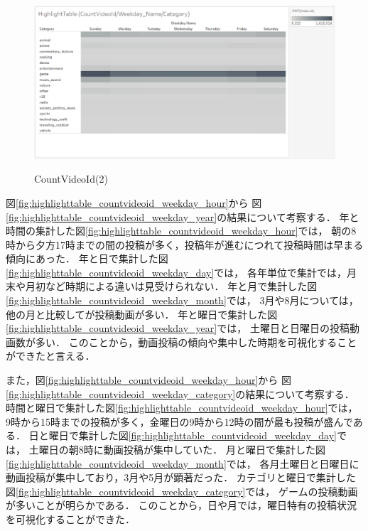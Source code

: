 \documentclass[submit,techrep,noauthor]{ipsj}
\begin{document}
\begin{figure}[h]
\begin{minipage}[b]{0.49\columnwidth}
    \label{fig:highlighttable_countvideoid_weekday_month}
  \end{minipage}
  \begin{minipage}[b]{0.49\columnwidth}
    \centering
    \includegraphics[width=\columnwidth]{./eps/HighlightTable_CountVideoId_WeekdayNameCategory.eps}
    \label{fig:highlighttable_countvideoid_weekday_category}
  \end{minipage}
  \caption{CountVideoId(2)}
  \label{fig:highlighttable_countvideoid_weekday}
\end{figure}
\vspace{-2.0zh}

図\ref{fig:highlighttable_countvideoid_weekday_hour}から
図\ref{fig:highlighttable_countvideoid_weekday_year}の結果について考察する．
%
年と時間の集計した図\ref{fig:highlighttable_countvideoid_weekday_hour}では，
朝の8時から夕方17時までの間の投稿が多く，投稿年が進むにつれて投稿時間は早まる傾向にあった．
%
年と日で集計した図\ref{fig:highlighttable_countvideoid_weekday_day}では，
各年単位で集計では，月末や月初など時期による違いは見受けられない．
%
年と月で集計した図\ref{fig:highlighttable_countvideoid_weekday_month}では，
3月や8月については，他の月と比較してが投稿動画が多い．
%
年と曜日で集計した図\ref{fig:highlighttable_countvideoid_weekday_year}では，
土曜日と日曜日の投稿動画数が多い．
%
このことから，動画投稿の傾向や集中した時期を可視化することができたと言える．

また，図\ref{fig:highlighttable_countvideoid_weekday_hour}から
図\ref{fig:highlighttable_countvideoid_weekday_category}の結果について考察する．
%
時間と曜日で集計した図\ref{fig:highlighttable_countvideoid_weekday_hour}では，
9時から15時までの投稿が多く，金曜日の9時から12時の間が最も投稿が盛んである．
%
日と曜日で集計した図\ref{fig:highlighttable_countvideoid_weekday_day}では，
土曜日の朝8時に動画投稿が集中していた．
%
月と曜日で集計した図\ref{fig:highlighttable_countvideoid_weekday_month}では，
各月土曜日と日曜日に動画投稿が集中しており，3月や5月が顕著だった．
%
カテゴリと曜日で集計した図\ref{fig:highlighttable_countvideoid_weekday_category}では，
ゲームの投稿動画が多いことが明らかである．
%
このことから，日や月では，曜日特有の投稿状況を可視化することができた．
\end{document}
